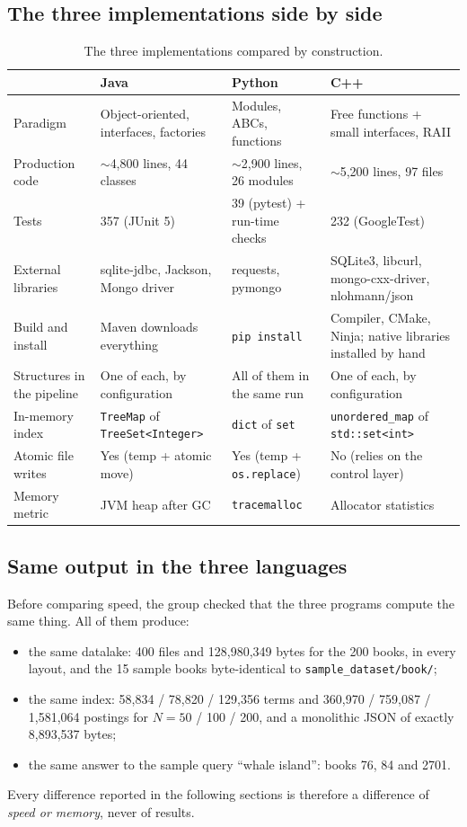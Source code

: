 \documentclass[11pt,a4paper]{article}
\newcommand{\code}[1]{\texttt{#1}}
\begin{document}
\subsection{The three implementations side by side}
\begin{table}[H]
\centering\small
\begin{tabularx}{\linewidth}{@{}L{3.2cm} Y Y Y@{}}
\toprule
 & Java & Python & C++ \\
\midrule
Paradigm & Object-oriented, interfaces, factories & Modules, ABCs, functions & Free functions + small interfaces, RAII \\
Production code & $\sim$4,800 lines, 44 classes & $\sim$2,900 lines, 26 modules & $\sim$5,200 lines, 97 files \\
Tests & 357 (JUnit 5) & 39 (pytest) + run-time checks & 232 (GoogleTest) \\
External libraries & sqlite-jdbc, Jackson, Mongo driver & requests, pymongo & SQLite3, libcurl, mongo-cxx-driver, nlohmann/json \\
Build and install & Maven downloads everything & \code{pip install} & Compiler, CMake, Ninja; native libraries installed by hand \\
Structures in the pipeline & One of each, by configuration & All of them in the same run & One of each, by configuration \\
In-memory index & \code{TreeMap} of \code{TreeSet<Integer>} & \code{dict} of \code{set} & \code{unordered\_map} of \code{std::set<int>} \\
Atomic file writes & Yes (temp + atomic move) & Yes (temp + \code{os.replace}) & No (relies on the control layer) \\
Memory metric & JVM heap after GC & \code{tracemalloc} & Allocator statistics \\
\bottomrule
\end{tabularx}
\caption{The three implementations compared by construction.}
\label{tab:sidebyside}
\end{table}

\subsection{Same output in the three languages}
Before comparing speed, the group checked that the three programs compute the same thing. All of
them produce:
\begin{itemize}
  \item the same datalake: 400 files and 128,980,349 bytes for the 200 books, in every layout, and the
        15 sample books byte-identical to \code{sample\_dataset/book/};
  \item the same index: 58,834 / 78,820 / 129,356 terms and 360,970 / 759,087 / 1,581,064
        postings for $N = 50$ / 100 / 200, and a monolithic JSON of exactly 8,893,537 bytes;
  \item the same answer to the sample query ``whale island'': books 76, 84 and 2701.
\end{itemize}
Every difference reported in the following sections is therefore a difference of \emph{speed or
memory}, never of results.
\end{document}
